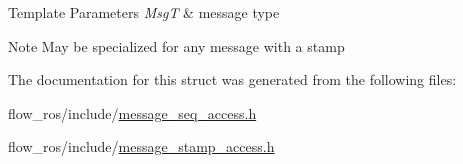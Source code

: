 \begin{DoxyTemplParams}{Template Parameters}
{\em MsgT} & message type\\
\hline
\end{DoxyTemplParams}
\begin{DoxyNote}{Note}
May be specialized for any message with a stamp 
\end{DoxyNote}


The documentation for this struct was generated from the following files\+:\begin{DoxyCompactItemize}
\item 
flow\+\_\+ros/include/\hyperlink{message__seq__access_8h}{message\+\_\+seq\+\_\+access.\+h}\item 
flow\+\_\+ros/include/\hyperlink{message__stamp__access_8h}{message\+\_\+stamp\+\_\+access.\+h}\end{DoxyCompactItemize}
